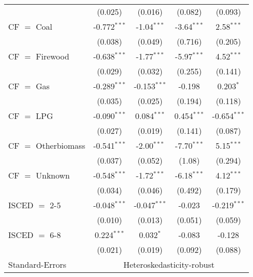 \begin{table}[htbp!]
\begin{adjustbox}{width = 1\textwidth, max height = 0.95\textheight, center}
\begin{threeparttable}[b]
\begin{tabular}{lcccc}
                                 & (0.025)            & (0.016)            & (0.082)       & (0.093)\\   
            CF $=$ Coal          & -0.772$^{***}$     & -1.04$^{***}$      & -3.64$^{***}$ & 2.58$^{***}$\\   
                                 & (0.038)            & (0.049)            & (0.716)       & (0.205)\\   
            CF $=$ Firewood      & -0.638$^{***}$     & -1.77$^{***}$      & -5.97$^{***}$ & 4.52$^{***}$\\   
                                 & (0.029)            & (0.032)            & (0.255)       & (0.141)\\   
            CF $=$ Gas           & -0.289$^{***}$     & -0.153$^{***}$     & -0.198        & 0.203$^{*}$\\   
                                 & (0.035)            & (0.025)            & (0.194)       & (0.118)\\   
            CF $=$ LPG           & -0.090$^{***}$     & 0.084$^{***}$      & 0.454$^{***}$ & -0.654$^{***}$\\   
                                 & (0.027)            & (0.019)            & (0.141)       & (0.087)\\   
            CF $=$ Otherbiomass  & -0.541$^{***}$     & -2.00$^{***}$      & -7.70$^{***}$ & 5.15$^{***}$\\   
                                 & (0.037)            & (0.052)            & (1.08)        & (0.294)\\   
            CF $=$ Unknown       & -0.548$^{***}$     & -1.72$^{***}$      & -6.18$^{***}$ & 4.12$^{***}$\\   
                                 & (0.034)            & (0.046)            & (0.492)       & (0.179)\\   
            ISCED $=$ 2-5        & -0.048$^{***}$     & -0.047$^{***}$     & -0.023        & -0.219$^{***}$\\   
                                 & (0.010)            & (0.013)            & (0.051)       & (0.059)\\   
            ISCED $=$ 6-8        & 0.224$^{***}$      & 0.032$^{*}$        & -0.083        & -0.128\\   
                                 & (0.021)            & (0.019)            & (0.092)       & (0.088)\\   
            \midrule 
            Standard-Errors & \multicolumn{4}{c}{Heteroskedasticity-robust} \\ 

\end{tabular}
\end{threeparttable}
\end{adjustbox}
\end{table}
